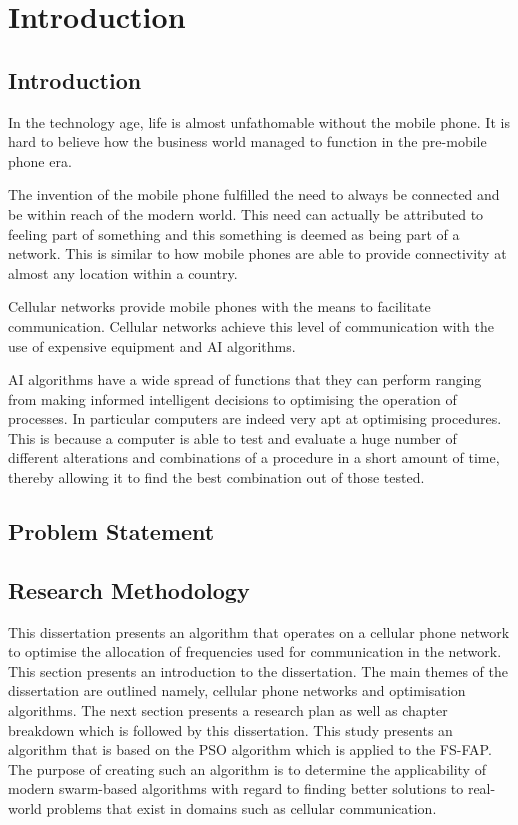 \chapter{Introduction}
\section{Introduction}
In the technology age, life is almost unfathomable without the mobile phone. It is hard to believe how the business world managed to function in the pre-mobile phone era.

The invention of the mobile phone fulfilled the need to always be connected and be within reach of the modern world. This need can actually be attributed to feeling part of something and this something is deemed as being part of a network. This is similar to how mobile phones are able to provide connectivity at almost any location within a country.

Cellular networks provide mobile phones with the means to facilitate communication. Cellular networks achieve this level of communication with the use of expensive equipment and \gls{AI} algorithms.

\gls{AI} algorithms have a wide spread of functions that they can perform ranging from making informed intelligent decisions to optimising the operation of processes. In particular computers are indeed very apt at optimising procedures. This is because a computer is able to test and evaluate a huge number of different alterations and combinations of a procedure in a short amount of time, thereby allowing it to find the best combination out of those tested.

\section{Problem Statement}

\section{Research Methodology}
This dissertation presents an algorithm that operates on a cellular phone network to optimise the allocation of frequencies used for communication in the network.
This section presents an introduction to the dissertation. The main themes of the dissertation are outlined namely, cellular phone networks and optimisation algorithms. The next section presents a research plan as well as chapter breakdown which is followed by this dissertation.
This study presents an algorithm that is based on the \gls{PSO} algorithm which is applied to the \gls{FS-FAP}. The purpose of creating such an algorithm is to determine the applicability of modern swarm-based algorithms with regard to finding better solutions to real-world problems that exist in domains such as cellular communication.

